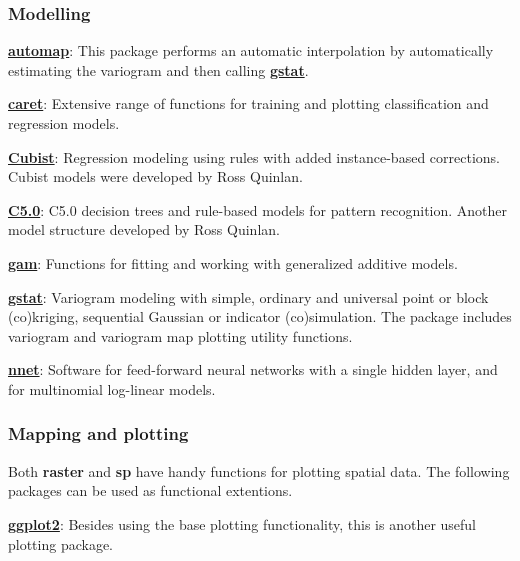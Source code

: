 \documentclass[10pt,b5paper,]{book}
\theoremstyle{definition}
\theoremstyle{definition}
\theoremstyle{definition}
\theoremstyle{remark}
\begin{document}
\hypertarget{modelling}{%
\subsubsection{Modelling}\label{modelling}}

\href{https://CRAN.R-project.org/package=automap}{\textbf{automap}}:
This package performs an automatic interpolation by automatically
estimating the variogram and then calling
\href{https://CRAN.R-project.org/package=gstat}{\textbf{gstat}}.

\href{https://CRAN.R-project.org/package=caret}{\textbf{caret}}:
Extensive range of functions for training and plotting classification
and regression models.

\href{https://CRAN.R-project.org/package=Cubist}{\textbf{Cubist}}:
Regression modeling using rules with added instance-based corrections.
Cubist models were developed by Ross Quinlan.

\href{https://CRAN.R-project.org/package=C5.0}{\textbf{C5.0}}: C5.0
decision trees and rule-based models for pattern recognition. Another
model structure developed by Ross Quinlan.

\href{https://CRAN.R-project.org/package=gam}{\textbf{gam}}: Functions
for fitting and working with generalized additive models.

\href{https://CRAN.R-project.org/package=gstat}{\textbf{gstat}}:
Variogram modeling with simple, ordinary and universal point or block
(co)kriging, sequential Gaussian or indicator (co)simulation. The
package includes variogram and variogram map plotting utility functions.

\href{https://CRAN.R-project.org/package=nnet}{\textbf{nnet}}: Software
for feed-forward neural networks with a single hidden layer, and for
multinomial log-linear models.

\hypertarget{mapping-and-plotting}{%
\subsubsection{Mapping and plotting}\label{mapping-and-plotting}}

Both \textbf{raster} and \textbf{sp} have handy functions for plotting
spatial data. The following packages can be used as functional
extentions.

\href{https://cran.r-project.org/web/packages/ggplot2/index.html}{\textbf{ggplot2}}:
Besides using the base plotting functionality, this is another useful
plotting package.
\end{document}
